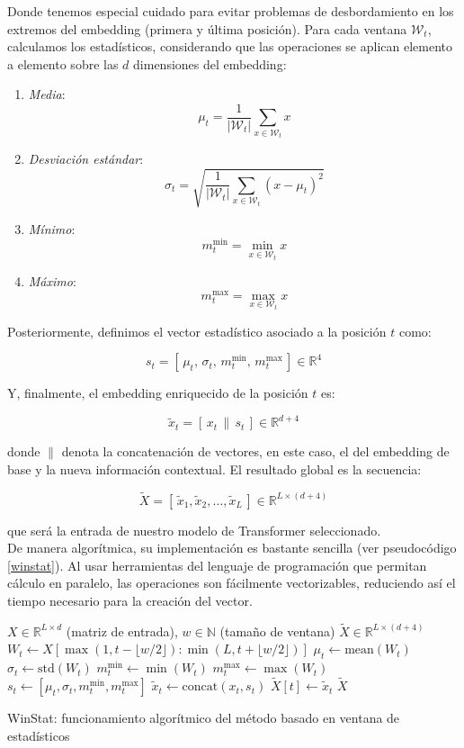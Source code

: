 Donde tenemos especial cuidado para evitar problemas de desbordamiento en los extremos del embedding (primera y última posición). Para cada ventana $\mathcal{W}_t$, calculamos los estadísticos, considerando que las operaciones se aplican elemento a elemento sobre las $d$ dimensiones del embedding:

\begin{enumerate}
	\item \textit{Media}:
	\[
	\mu_t = \frac{1}{|\mathcal{W}_t|} \sum_{x \in \mathcal{W}_t} x
	\]
	\item \textit{Desviación estándar}:
	\[
	\sigma_t = \sqrt{ \frac{1}{|\mathcal{W}_t|} \sum_{x \in \mathcal{W}_t} (x - \mu_t)^2 }
	\]
	\item \textit{Mínimo}:
	\[
	m^{\min}_t = \min_{x \in \mathcal{W}_t} x
	\]
	\item \textit{Máximo}:
	\[
	m^{\max}_t = \max_{x \in \mathcal{W}_t} x
	\]
\end{enumerate}

Posteriormente, definimos el vector estadístico asociado a la posición $t$ como:

\[
s_t = [\,\mu_t,\, \sigma_t,\, m^{\min}_t,\, m^{\max}_t\,] \in \mathbb{R}^{4}
\]

Y, finalmente, el embedding enriquecido de la posición $t$ es:

\[
\tilde{x}_t = [\,x_t \, \| \, s_t\,] \in \mathbb{R}^{d+4}
\]

donde $\|$ denota la concatenación de vectores, en este caso, el del embedding de base y la nueva información contextual. El resultado global es la secuencia:

\[
\tilde{X} = [\,\tilde{x}_1, \tilde{x}_2, \dots, \tilde{x}_L\,] \in \mathbb{R}^{L \times (d+4)}
\]

que será la entrada de nuestro modelo de Transformer seleccionado.\\

De manera algorítmica, su implementación es bastante sencilla (ver pseudocódigo \ref{winstat}). Al usar herramientas del lenguaje de programación que permitan cálculo en paralelo, las operaciones son fácilmente vectorizables, reduciendo así el tiempo necesario para la creación del vector.



\begin{algorithm}[H]
	\begin{algorithmic}[1]
		\REQUIRE $X \in \mathbb{R}^{L \times d}$ (matriz de entrada), $w \in \mathbb{N}$ (tamaño de ventana)
		\ENSURE $\tilde{X} \in \mathbb{R}^{L \times (d+4)}$
		\STATE $W_t \gets X[\max(1, t - \lfloor w/2 \rfloor) : \min(L, t + \lfloor w/2 \rfloor)]$
		\STATE $\mu_t \gets \text{mean}(W_t)$
		\STATE $\sigma_t \gets \text{std}(W_t)$
		\STATE $m^{\min}_t \gets \min(W_t)$
		\STATE $m^{\max}_t \gets \max(W_t)$
		\STATE $s_t \gets [\mu_t, \sigma_t, m^{\min}_t, m^{\max}_t]$
		\STATE $\tilde{x}_t \gets \text{concat}(x_t, s_t)$
		\STATE $\tilde{X}[t] \gets \tilde{x}_t$
		\ENDFOR
		\RETURN $\tilde{X}$
	\end{algorithmic}
	\caption{WinStat: funcionamiento algorítmico del método basado en ventana de estadísticos}
	\label{winstat}
\end{algorithm}

